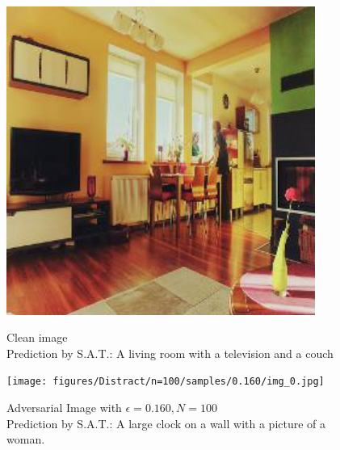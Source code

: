 \begin{figure}[ht]
    \centering
    \begin{minipage}{0.45\textwidth}
        \centering
        \includegraphics[width=0.9\textwidth]{figures/Distract/n=100/samples/0.000/img_0.jpg} %
        \caption*{Clean image\\Prediction by S.A.T.: A living room with a television and a couch}
    \end{minipage}\hfill
    \begin{minipage}{0.45\textwidth}
        \centering
        \texttt{[image: figures/Distract/n=100/samples/0.160/img\_0.jpg]} %
        \caption*{Adversarial Image with $\epsilon=0.160, N=100$\\Prediction by S.A.T.: A large clock on a wall with a picture of a woman.}
    \end{minipage}
\end{figure}

